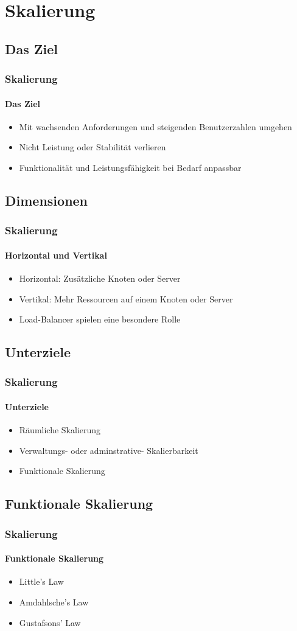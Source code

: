 \section{Skalierung}
\subsection{Das Ziel}
\begin{frame}
  \frametitle{Skalierung}
  \framesubtitle{Das Ziel}
  \begin{itemize}
    \item Mit wachsenden Anforderungen und steigenden Benutzerzahlen umgehen
    \item Nicht Leistung oder Stabilität verlieren
    \item Funktionalität und Leistungsfähigkeit bei Bedarf anpassbar
  \end{itemize}
\end{frame}

\subsection{Dimensionen}
\begin{frame}
  \frametitle{Skalierung}
  \framesubtitle{Horizontal und Vertikal}
  \begin{itemize}
    \item Horizontal: Zusätzliche Knoten oder Server
    \item Vertikal: Mehr Ressourcen auf einem Knoten oder Server 
    \item Load-Balancer spielen eine besondere Rolle
  \end{itemize}
\end{frame}

\subsection{Unterziele}
\begin{frame}
  \frametitle{Skalierung}
  \framesubtitle{Unterziele}
  \begin{itemize}
    \item Räumliche Skalierung
    \item Verwaltungs- oder adminstrative- Skalierbarkeit
    \item Funktionale Skalierung
  \end{itemize}
\end{frame}

\subsection{Funktionale Skalierung}
\begin{frame}
  \frametitle{Skalierung}
  \framesubtitle{Funktionale Skalierung}
  \begin{itemize}
    \item Little's Law
    \item Amdahlsche's Law
    \item Gustafsons' Law 
  \end{itemize}
\end{frame}

